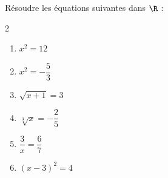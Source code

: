 \begin{exo}{}
	Résoudre les équations suivantes dans $\R$ :
	\vspace*{-2mm}
	\begin{multicols}{2}
	\begin{enumerate}[itemsep=2mm]
		\item $x^2 = 12$
		\item $x^2 = -\dfrac{5}{3}$
		\item $\sqrt{x+1} = 3$
		\item $\sqrt[3]{x} = -\dfrac{2}{5}$
		\item $\dfrac{3}{x} = \dfrac{6}{7}$
		\item $(x-3)^2 = 4$
	\end{enumerate}
	\end{multicols}\vspace*{-2mm}
\end{exo}
